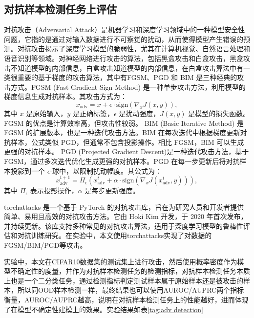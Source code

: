\subsection{对抗样本检测任务上评估}
对抗攻击（Adversarial Attack）是机器学习和深度学习领域中的一种模型安全性问题，它指的是通过对输入数据进行不可察觉的扰动，从而使得模型产生错误的预测。对抗攻击揭示了深度学习模型的脆弱性，尤其在计算机视觉、自然语言处理和语音识别等领域。对神经网络进行攻击的算法，包括黑盒攻击和白盒攻击，黑盒攻击不知道模型的内部信息，白盒攻击知道模型的内部信息，在白盒攻击算法中有一类很重要的基于梯度的攻击算法，其中有FGSM、PGD 和 BIM 是三种经典的攻击方式。FGSM (Fast Gradient Sign Method) 是一种单步攻击方法，利用模型的梯度信息生成对抗样本。其攻击方式为：
    \[
    x_{\text{adv}} = x + \epsilon \cdot \text{sign}(\nabla_x J(x, y)),
    \]
    其中 $x$ 是原始输入，$y$ 是正确标签，$\epsilon$ 是扰动强度，$J(x, y)$ 是模型的损失函数。FGSM 的优点是计算效率高，但攻击性较弱。   BIM (Basic Iterative Method) 是 FGSM 的扩展版本，也是一种迭代攻击方法。BIM 在每次迭代中根据梯度更新对抗样本，公式类似 PGD，但通常不包含投影操作。相比 FGSM，BIM 可以生成更强的对抗样本。
   PGD (Projected Gradient Descent)是一种迭代攻击方法，基于 FGSM，通过多次迭代优化生成更强的对抗样本。PGD 在每一步更新后将对抗样本投影到一个 $\epsilon$-球中，以限制扰动幅度。其公式为：
    \[
    x_{\text{adv}}^{t+1} = \Pi_{\epsilon}(x_{\text{adv}}^t + \alpha \cdot \text{sign}(\nabla_x J(x_{\text{adv}}^t, y))),
    \]
    其中 $\Pi_{\epsilon}$ 表示投影操作，$\alpha$ 是每步更新强度。

torchattacks\cite{kim2020torchattacks} 是一个基于 PyTorch 的对抗攻击库，旨在为研究人员和开发者提供简单、易用且高效的对抗攻击方法。它由 Hoki Kim 开发，于 2020 年首次发布，并持续更新。该库支持多种常见的对抗攻击算法，适用于深度学习模型的鲁棒性评估和对抗训练研究。在实验中，本文使用torchattacks实现了对数据的FGSM/BIM/PGD等攻击。

实验中，本文在CIFAR10数据集的测试集上进行攻击，然后使用概率密度作为模型不确定性的度量，并作为对抗样本检测任务的检测指标，对抗样本检测任务本质上也是一个二分类任务，通过检测指标判定测试样本属于原始样本还是被攻击的样本，所以同OOD样本检测一样，最终结果也可以使用AUROC/AUPRC两个指标衡量，AUROC/AUPRC越高，说明在对抗样本检测任务上的性能越好，进而体现了在模型不确定性建模上的效果。实验结果如表\ref{tag:adv detection}




